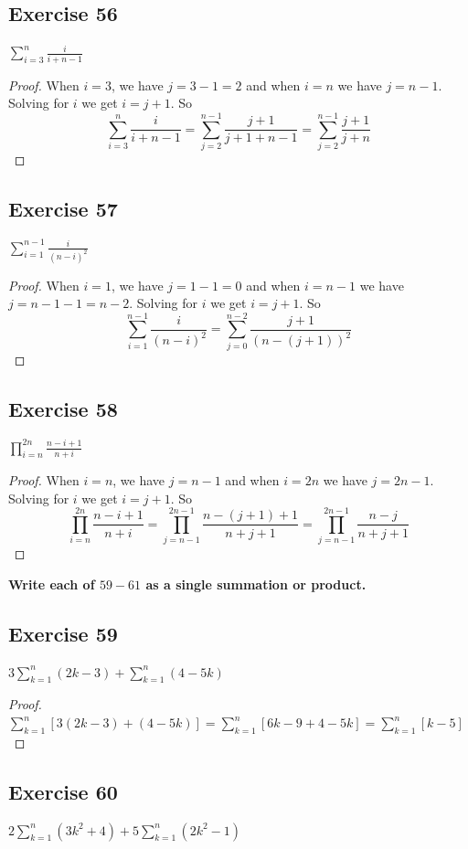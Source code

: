 \documentclass[14pt]{extarticle}
\newcommand{\dps}{\displaystyle}
\newcommand{\cy}{\color{cyan}}
\begin{document}
\subsection{Exercise 56}
$\dps\sum_{i=3}^{n}\frac{i}{i+n-1}$

\begin{proof}
When $i = 3$, we have $j = 3-1 = 2$ and when $i = n$ we have $j = n-1$. Solving for $i$ we get $i = j+1$. So
\[
\sum_{i=3}^{n}\frac{i}{i+n-1} = \sum_{j=2}^{n-1}\frac{j+1}{j+1+n-1} = \sum_{j=2}^{n-1}\frac{j+1}{j+n}
\]
\end{proof}

\subsection{Exercise 57}
$\dps\sum_{i=1}^{n-1}\frac{i}{(n-i)^2}$

\begin{proof}
When $i = 1$, we have $j = 1-1 = 0$ and when $i = n-1$ we have $j = n-1-1 = n-2$. Solving for $i$ we get $i = j+1$. So
\[
\sum_{i=1}^{n-1}\frac{i}{(n-i)^2} = \sum_{j=0}^{n-2}\frac{j+1}{(n-(j+1))^2}
\]
\end{proof}

\subsection{Exercise 58}
$\dps\prod_{i=n}^{2n}\frac{n-i+1}{n+i}$

\begin{proof}
When $i = n$, we have $j = n-1$ and when $i = 2n$ we have $j = 2n-1$. Solving for $i$ we get $i = j+1$. So
\[
\prod_{i=n}^{2n}\frac{n-i+1}{n+i} = \prod_{j=n-1}^{2n-1}\frac{n-(j+1)+1}{n+j+1} = \prod_{j=n-1}^{2n-1}\frac{n-j}{n+j+1}
\]
\end{proof}

{\bf\cy Write each of $59-61$ as a single summation or product.}

\subsection{Exercise 59}
$\dps 3\sum_{k=1}^{n}(2k-3) + \sum_{k=1}^{n}(4-5k)$

\begin{proof}
$\dps\sum_{k=1}^{n}[3(2k-3) + (4-5k)] = \sum_{k=1}^{n}[6k-9 + 4-5k] = \sum_{k=1}^{n}[k-5]$
\end{proof}

\subsection{Exercise 60}
$\dps 2\sum_{k=1}^{n}(3k^2+4) + 5\sum_{k=1}^{n}(2k^2-1)$
\end{document}
